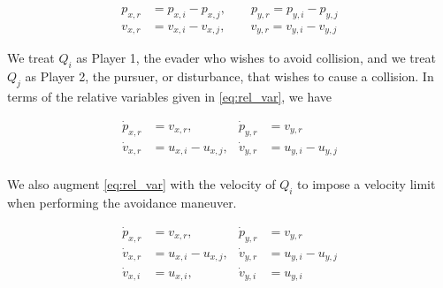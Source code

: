 \begin{equation} \label{eq:rel_var}
\begin{aligned}
p_{x,r} &= p_{x,i} - p_{x,j}, \qquad p_{y,r} = p_{y,i} - p_{y,j}\\
v_{x,r} &= v_{x,i} - v_{x,j}, \qquad v_{y,r} = v_{y,i} - v_{y,j}
\end{aligned}
\end{equation}

We treat $Q_i$ as Player 1, the evader who wishes to avoid collision, and we treat $Q_j$ as Player 2, the pursuer, or disturbance, that wishes to cause a collision. In terms of the relative variables given in \eqref{eq:rel_var}, we have 

\begin{equation}
\begin{aligned}
\dot{p}_{x,r}& = v_{x,r}, &\dot{p}_{y,r} &= v_{y,r} \\
\dot{v}_{x,r}& = u_{x,i} - u_{x,j}, &\dot{v}_{y,r} &= u_{y,i} - u_{y,j}\\
\end{aligned}
\end{equation}

We also augment \eqref{eq:rel_var} with the velocity of $Q_i$ to impose a velocity limit when performing the avoidance maneuver.

\begin{equation} \label{eq:rel_dyn_aug}
\begin{aligned}
\dot{p}_{x,r} &= v_{x,r}, &\dot{p}_{y,r} &= v_{y,r} \\
\dot{v}_{x,r} &= u_{x,i} - u_{x,j}, &\dot{v}_{y,r}&= u_{y,i} - u_{y,j}\\
\dot{v}_{x,i} &= u_{x,i}, &\dot{v}_{y,i} &= u_{y,i} \\
\end{aligned}
\end{equation}

